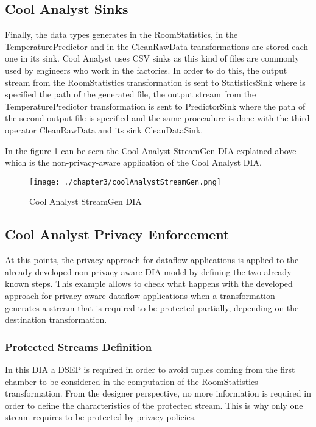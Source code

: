 \subsection{Cool Analyst Sinks}

Finally, the data types generates in the RoomStatistics, in the TemperaturePredictor and in the CleanRawData transformations are stored each one in its sink. Cool Analyst uses CSV sinks as this kind of files are commonly used by engineers who work in the factories. In order to do this, the output stream from the RoomStatistics transformation is sent to StatisticsSink where is specified the path of the generated file, the output stream from the TemperaturePredictor transformation is sent to PredictorSink where the path of the second output file is specified and the same proceadure is done with the third operator CleanRawData and its sink CleanDataSink.

In the figure \ref{fig:Cool Analyst StreamGen DIA} can be seen the Cool Analyst StreamGen DIA explained above which is the non-privacy-aware application of the Cool Analyst DIA.

\begin{figure}
\centering
{\texttt{[image: ./chapter3/coolAnalystStreamGen.png]}}
\caption{Cool Analyst StreamGen DIA}
\label{fig:Cool Analyst StreamGen DIA}
\end{figure}

\subsection{Cool Analyst Privacy Enforcement}

At this points, the privacy approach for dataflow applications is applied to the already developed non-privacy-aware DIA model by defining the two already known steps. This example allows to check what happens with the developed approach for privacy-aware dataflow applications when a transformation generates a stream that is required to be protected partially, depending on the destination transformation.

\subsubsection{Protected Streams Definition}

In this DIA a DSEP is required in order to avoid tuples coming from the first chamber to be considered in the computation of the RoomStatistics transformation. From the designer perspective, no more information is required in order to define the characteristics of the protected stream. This is why only one stream requires to be protected by privacy policies.

